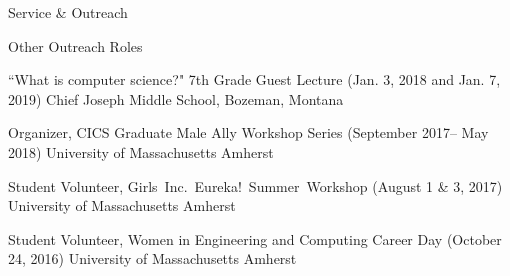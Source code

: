 \documentclass{resume} %
\begin{document}
\begin{rSection}{Service \& Outreach}
\begin{rSubsection}{Other Outreach Roles}{}{}{}
\item {``What is computer science?" 7th Grade Guest Lecture} ({Jan. 3, 2018 and Jan. 7, 2019}) 
{Chief Joseph Middle School, Bozeman, Montana}

\item {Organizer, CICS Graduate Male Ally Workshop Series} ({September 2017-- May 2018}) {University of Massachusetts Amherst}

\item {Student Volunteer, Girls~Inc.~Eureka!~Summer~Workshop} ({August 1 \& 3, 2017}) {University of Massachusetts Amherst}

\item {Student Volunteer, Women in Engineering and Computing Career Day} ({October 24, 2016})
{University of Massachusetts Amherst}{}
\end{rSubsection}

\end{rSection}







\end{document}
